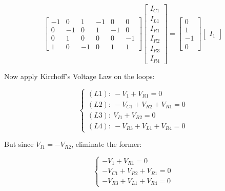 \begin{example}
\begin{equation} %
%
	\left[\begin{array}{ccccccc}
	-1 &  0 &  1 &-1 & 0 & 0\\[3mm]
	 0 & -1 &  0 & 1 &-1 & 0\\[3mm]
	 0 &  1 &  0 & 0 & 0 &-1\\[3mm]
	 1 &  0 & -1 & 0 & 1 & 1
	\end{array}\right]
%
	\left[\begin{array}{c}
		I_{C1} \\[3mm] I_{L1} \\[3mm] I_{R1} \\[3mm] I_{R2} \\[3mm] I_{R3} \\[3mm] I_{R4}
	\end{array}\right] =
%
	\left[\begin{array}{c}
		0 \\[3mm] 1 \\[3mm] -1 \\[3mm] 0
	\end{array}\right]
%
	\left[\begin{array}{c}
		I_1
	\end{array}\right] \label{eq:example_KCL_phasor}
\end{equation} %

	Now apply Kirchoff's Voltage Law on the loops:

\begin{equation} %
	\left\{\begin{array}{l}
		(L1):\ -V_1 + V_{R1}          = 0 \\[3mm]
		(L2):\ -V_{C1} + V_{R2} + V_{R1} = 0 \\[3mm]
		(L3):\  V_{I1} + V_{R2}          = 0 \\[3mm]
		(L4):\ -V_{R3} + V_{L1} + V_{R4} = 0 
	\end{array}\right.
\end{equation} %

	But since $V_{I1} = -V_{R2}$, eliminate the former:

\begin{equation} %
	\left\{\begin{array}{l}
		-V_1 + V_{R1}          = 0 \\[3mm]
		-V_{C1} + V_{R2} + V_{R1} = 0 \\[3mm]
		-V_{R3} + V_{L1} + V_{R4} = 0 
	\end{array}\right.
\end{equation} %


\end{example}
